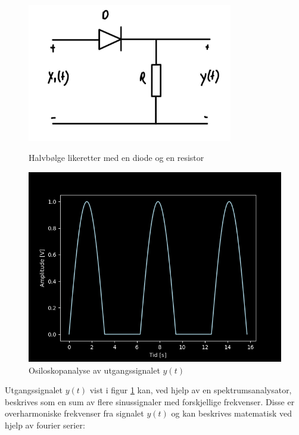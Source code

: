 \documentclass[a4paper,11pt,norsk]{article}
\begin{document}
\begin{figure}[H]
    \centering
    \begin{minipage}{0.45\textwidth}
        \centering
        \includegraphics[width=0.8\textwidth]{D1/Images/dioderesistor.jpg}  \caption{Halvbølge likeretter med en diode og en resistor}
        \label{fig:2}
    \end{minipage}\hfill
    \begin{minipage}{0.45\textwidth}
        \centering
        \includegraphics[width=1\textwidth]{D1/Images/halfwave.png} 
        \caption{Osiloskopanalyse av utgangssignalet $y(t)$}
        \label{fig:3}
    \end{minipage}
\end{figure}

Utgangssignalet $y(t)$ vist i figur \ref{fig:3} kan, ved hjelp av en spektrumsanalysator, beskrives som en sum av flere sinussignaler med forskjellige frekvenser. Disse er overharmoniske frekvenser fra signalet $y(t)$ og kan beskrives matematisk ved hjelp av fourier serier:
\end{document}
